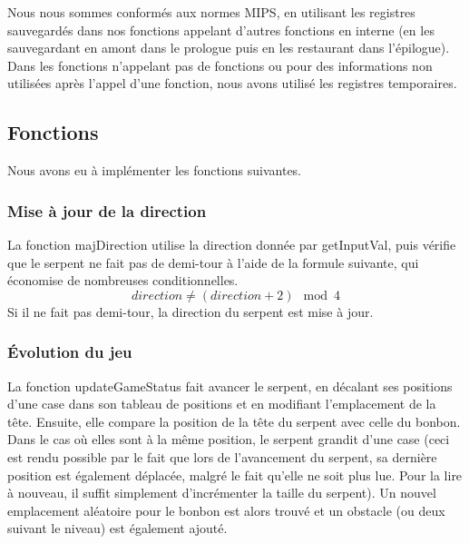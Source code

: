 \documentclass[a4paper]{article}
\begin{document}
Nous nous sommes conformés aux normes MIPS, en utilisant les registres sauvegardés
dans nos fonctions appelant d'autres fonctions en interne (en les sauvegardant en amont dans le prologue puis en les restaurant dans l'épilogue).
Dans les fonctions n'appelant pas de fonctions ou pour des informations non utilisées après l'appel d'une fonction,
nous avons utilisé les registres temporaires.


\subsection{Fonctions}

Nous avons eu à implémenter les fonctions suivantes.

\subsubsection*{Mise à jour de la direction}
La fonction majDirection utilise la direction donnée par getInputVal, puis vérifie que le serpent ne fait pas de demi-tour à l'aide de la formule suivante,
qui économise de nombreuses conditionnelles.
\[ direction \neq (direction+2)\mod{4} \]
Si il ne fait pas demi-tour, la direction du serpent est mise à jour.

\subsubsection*{Évolution du jeu}
La fonction updateGameStatus fait avancer le serpent, en décalant ses positions d'une case dans son tableau de positions et en modifiant l'emplacement de la tête.
Ensuite, elle compare la position de la tête du serpent avec celle du bonbon. Dans le cas où elles sont à la même position, 
le serpent grandit d'une case (ceci est rendu possible par le fait que lors de l'avancement du serpent, sa dernière position est également déplacée,
malgré le fait qu'elle ne soit plus lue. Pour la lire à nouveau, il suffit simplement d'incrémenter la taille du serpent).
Un nouvel emplacement aléatoire pour le bonbon est alors trouvé et un obstacle (ou deux suivant le niveau) est également ajouté.
\end{document}
